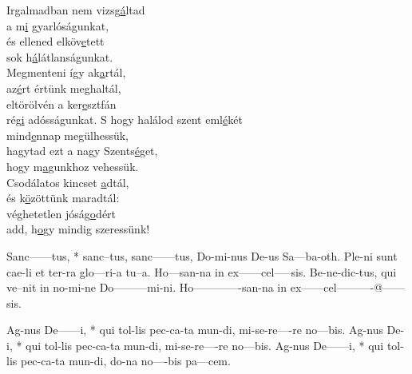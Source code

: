 \documentclass[twoside]{article}
\begin{document}
\begin{hymnstanzas}
  Irgalmadban nem vizsg\underline{á}ltad\\
  a m\underline{i} gyarlóságunkat,\\
  és ellened elköv\underline{e}tett\\
  sok h\underline{á}látlanságunkat.\\
  Megmenteni így ak\underline{a}rtál,\\
  az\underline{é}rt értünk meghaltál,\\
  eltörölvén a ker\underline{e}sztfán\\
  rég\underline{i} adósságunkat.
\stanzabreak
  S hogy halálod szent eml\underline{é}két\\
  mind\underline{e}nnap megülhessük,\\
  hagytad ezt a nagy Szents\underline{é}get,\\
  hogy m\underline{a}gunkhoz vehessük.\\
  Csodálatos kincset \underline{a}dtál,\\
  és k\underline{ö}zöttünk maradtál:\\
  véghetetlen jóság\underline{o}dért\\
  add, h\underline{o}gy mindig szeressünk!
\end{hymnstanzas}


\begin{gregosheet}
            {  Sanc------tus, * sanc--tus,      sanc------tus, Do-mi-nus De-us Sa---ba-oth. Ple-ni sunt cae-li et ter-ra  glo---ri-a   tu--a.  Ho---san-na  in    ex------cel-----sis. Be-ne-dic-tus, qui ve--nit in no-mi-ne Do---------mi-ni.  Ho-------------san-na  in    ex------cel----------@------sis.}
\end{gregosheet}


\begin{gregosheet}
            {  Ag-nus De------i, * qui tol-lis pec-ca-ta    mun-di, mi-se-re----re no---bis. Ag-nus De-i, * qui tol-lis pec-ca-ta    mun-di, mi-se-re----re no---bis. Ag-nus De------i, * qui tol-lis pec-ca-ta    mun-di, do-na no----bis pa---cem.}
\end{gregosheet}
\end{document}
